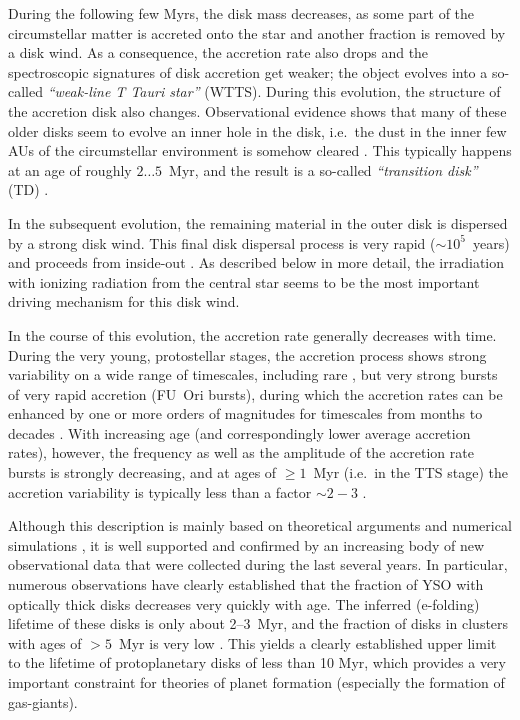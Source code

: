 \documentclass[10pt,fleqn,twoside]{article}
\begin{document}
\smallskip

During the following few Myrs, the disk mass decreases, as some part of
the circumstellar matter is accreted onto the star and another fraction
is removed by a disk wind.
As a consequence, the accretion rate also drops and the spectroscopic 
signatures of disk accretion get weaker; 
the object evolves into a so-called   {\em ``weak-line T Tauri star''}
(WTTS).
During this evolution, the structure of the accretion disk also changes.
Observational evidence  shows that many of these older disks 
seem to evolve an inner hole in the disk, i.e.~the dust in the inner few AUs of the
circumstellar environment is somehow cleared \citep[e.g.,][]{Alexander14,Koepferl13}.
This typically happens at an age of roughly $ 2 \dots 5$~Myr, and
the result is a so-called {\em ``transition disk''} (TD)
\citep[see][]{Owen16}.
\smallskip

In the subsequent evolution, the remaining material in the outer
disk is dispersed by a strong disk wind.
This final disk dispersal process is very rapid ($\sim 10^5$~years)
and proceeds from inside-out \citep{Ercolano14}. As described below in more detail,
the irradiation with ionizing radiation from the central star seems to be
the most important driving mechanism for this disk wind.

\medskip

In the course of this  evolution, the accretion rate generally decreases with time. 
During the very young, protostellar stages,
the accretion process shows strong
 variability on a wide range of timescales, including rare \citep[see][]{HF15}, 
but very strong
bursts of very rapid accretion (FU~Ori bursts), during
which the accretion rates
can be enhanced  by one or more orders of magnitudes for timescales
from months to decades
\citep[see][and the illustration in Fig.~\ref{hartmann.fig}]{Hartmann16}.
%
With increasing age (and correspondingly lower average accretion rates),
however,
the frequency as well as the amplitude of the accretion rate
bursts is strongly decreasing, and at ages of $\ge 1$~Myr (i.e.~in the
TTS stage) the accretion variability is typically less than a factor $\sim 2-3$
\citep[see][]{Venuti14}.




\medskip

Although this description is mainly based on theoretical arguments and
numerical simulations \citep{Ercolano11,Alexander14}, it is well supported and confirmed by an
increasing body of new observational 
data that were collected during the last several years. 
%
In particular, numerous observations have clearly established that
the fraction of YSO with optically thick disks decreases very
quickly with age. The inferred (e-folding) lifetime of these disks
is only about 2--3~Myr, and the fraction of disks in clusters 
with  ages of $> 5$~Myr is very low \citep[e.g.,][]{Hernandez07}. This yields a clearly
established upper limit to the lifetime of protoplanetary disks of
 less than 10 Myr, which provides 
a very important constraint for theories of planet formation
(especially the formation of gas-giants).
\end{document}
